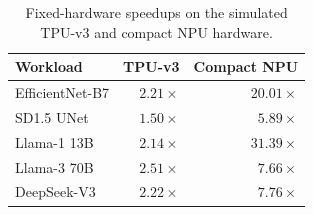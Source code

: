 \begin{table}
\vspace{-12pt}
\centering\small
\caption{Fixed-hardware speedups on the simulated TPU-v3 and compact NPU hardware.}
\label{tab:fixed_hw}
\begin{tabular}{@{}lrr@{}}
\toprule
Workload & TPU-v3 & Compact NPU \\
\midrule
EfficientNet-B7 & $2.21\times$ & $20.01\times$ \\
SD1.5 UNet & $1.50\times$ & $5.89\times$ \\
Llama-1 13B & $2.14\times$ & $31.39\times$ \\
Llama-3 70B & $2.51\times$ & $7.66\times$ \\
DeepSeek-V3 & $2.22\times$ & $7.76\times$ \\
\bottomrule
\end{tabular}
\vspace{-8pt}
\end{table}
